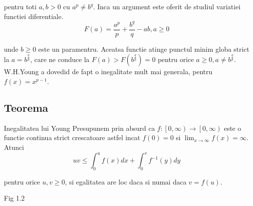 \documentclass[a4paper,12pt,oneside]{report}
\begin{document}
pentru toti \(a,b>0\) cu \(a^{p}\neq b^{q}\). Inca un argument este oferit de studiul variatiei functiei diferentiale. 
\begin{displaymath}
  F\left ( a \right )= \frac{a^{p}}{p}+\frac{b^{q}}{q} - ab, a\geq 0
\end{displaymath}

unde \(b\geq 0\) este un paramentru. Aceatsa functie atinge punctul minim globa strict la \(a= b^{\frac{q}{p}}\), care ne conduce la \(F\left ( a \right )> F\left ( b^{\frac{q}{p}} \right ) = 0\) pentru orice \(a\geq 0, a\neq b^{\frac{q}{p}}\). 
	W.H.Young a dovedid de fapt  o inegalitate mult mai generala, pentru \(f\left ( x \right )=  x^{p-1}\).

\subsection{Teorema}

Inegalitatea lui Young
Presupunem prin absurd ca \(f: \left [ 0,\infty  \right ) \rightarrow \left [ 0,\infty  \right )\) este o functie continua strict crescatoare astfel incat \(f\left ( 0 \right )= 0\) si \(\lim_{x\rightarrow \infty }f\left ( x \right )= \infty\). Atunci 
\begin{displaymath}
  uv\leq \int_{0}^{u}f\left ( x \right )dx + \int_{0}^{v}f^{-1}\left ( y \right )dy
\end{displaymath}

pentru orice \(u,v\geq 0\), si egalitatea are loc daca si numai daca \( v = f\left ( u \right )\). 

Fig 1.2
\end{document}
